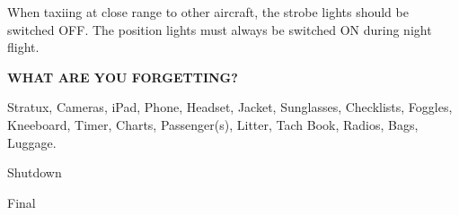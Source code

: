 \documentclass[10pt]{article}
\begin{document}
\noindent
\hrulefill
\smallskip

\noindent When taxiing at close range to other aircraft, the strobe lights
should be switched OFF. The position lights must always be switched ON during
night flight.

\noindent
\hrulefill

\centerline{\bf WHAT ARE YOU FORGETTING?}
\smallskip

\noindent Stratux, Cameras, iPad, Phone, Headset, Jacket, Sunglasses,
Checklists, Foggles, Kneeboard, Timer, Charts, Passenger(s), Litter,
Tach Book, Radios, Bags, Luggage.

\pagebreak

\centerline{{\Huge \sc Shutdown }}

\bigskip

\begin{center}
\end{center}

\bigskip

\centerline{{\Huge \sc Final }}

\bigskip

\begin{center}
\end{center}
\end{document}
